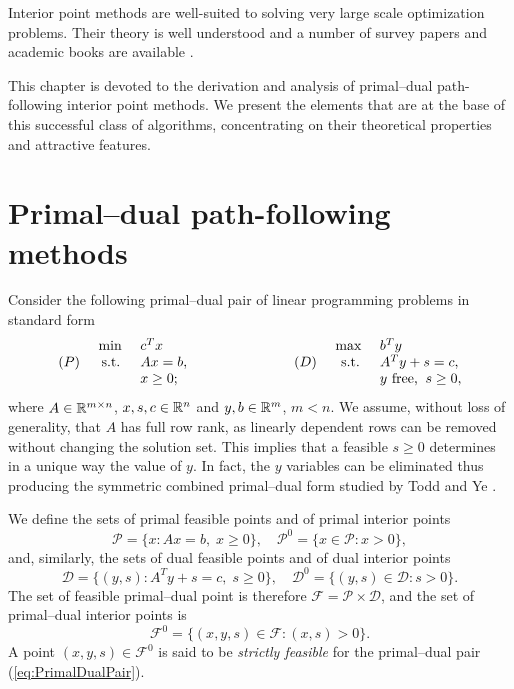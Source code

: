 
%
%
\label{ch:Ipm}

Interior point methods are well-suited to solving very
large scale optimization problems. Their theory is well understood
and a number of survey papers and academic books are available
\cite{Gonzaga92,MWright92,ipm:Wright97}.

This chapter is devoted to the derivation and analysis of primal--dual
path-following interior point methods. 
We present the elements that are at the base of this successful class
of algorithms, concentrating on their theoretical properties and
attractive features.


%
%
\section{Primal--dual path-following methods}
\label{sec:Derivation}

Consider the following primal--dual pair of linear programming problems 
in standard form
%
\begin{eqnarray} \label{eq:PrimalDualPair}
  \begin{array}{crlp{2cm}crl}
     & \mbox{ min } & c^T x     &  &     & \mbox{ max }  & b^T y \\
 (P) &\mbox{ s.t. } & Ax = b,   &  & (D) & \mbox{ s.t. } & A^T y + s = c, \\
     &              & x \geq 0; &  &     &   & y \mbox{ free,} \;\; s \geq 0,
  \end{array}
\end{eqnarray}
%
where $A \in \mathbb{R}^{m \times n}$, $x, s, c \in \mathbb{R}^{n}$ 
and $y, b \in \mathbb{R}^{m}$, $m<n$. We assume, without loss of generality,
that $A$ has full row rank, as linearly dependent rows can be
removed without changing the solution set.
This implies that a feasible $s \ge 0$ determines in a unique
way the value of $y$.
In fact, the $y$ variables can be eliminated thus producing the
symmetric combined primal--dual form studied by Todd and Ye \cite{ToddYe90}.

We define the sets of primal feasible points and of
primal interior points 
\[
\mathcal{P} = \{ x : Ax = b, \; x \ge 0 \}, \quad
\mathcal{P}^0 = \{ x \in \mathcal{P} : x > 0 \},
\]
and, similarly, the sets of dual feasible points and of
dual interior points
\[
\mathcal{D} = \{ (y,s) : A^T y + s = c, \; s \ge 0 \}, \quad
\mathcal{D}^0 = \{ (y,s) \in \mathcal{D} : s > 0 \}.
\]
The set of feasible primal--dual point is therefore
$\mathcal{F} = \mathcal{P} \times \mathcal{D}$, and the set of primal--dual
interior points is
\[
\mathcal{F}^0 = \{ (x,y,s) \in \mathcal{F} : (x,s) > 0 \}.
\]
A point $(x,y,s) \in \mathcal{F}^0$ is said to be {\em strictly feasible}
for the primal--dual pair (\ref{eq:PrimalDualPair}).

